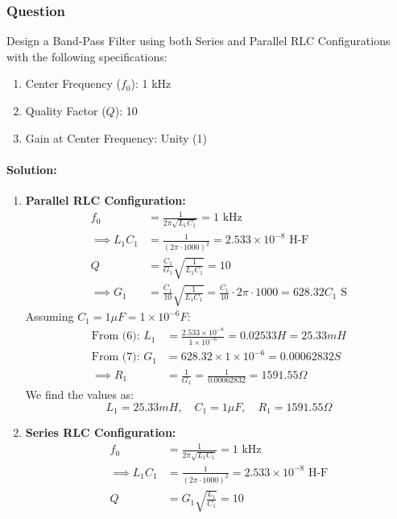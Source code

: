 \subsubsection{Question}
Design a Band-Pass Filter using both Series and Parallel RLC
Configurations with the following specifications:
\begin{enumerate}
  \item Center Frequency (\(f_0\)): 1 kHz
  \item Quality Factor (\(Q\)): 10
  \item Gain at Center Frequency: Unity (1)
\end{enumerate}
\paragraph{Solution:}
\begin{enumerate}
  \item \textbf{Parallel RLC Configuration:}
    \begin{align*}
      f_0 &= \frac{1}{2\pi \sqrt{L_1 C_1}} = 1 \text{ kHz} \\
      \implies L_1 C_1 &= \frac{1}{(2\pi \cdot 1000)^2} = 2.533 \times 10^{-8} \text{ H-F} \tag{6} \\
      Q &= \frac{C_1}{G_1} \sqrt{\frac{1}{L_1 C_1}} = 10 \\
      \implies G_1 &= \frac{C_1}{10} \sqrt{\frac{1}{L_1 C_1}} = \frac{C_1}{10} \cdot 2\pi \cdot 1000 = 628.32 C_1 \text{ S} \tag{7}
    \end{align*}
    Assuming \(C_1 = 1 \mu F = 1 \times 10^{-6} F\):
    \begin{align*}
      \text{From (6): } L_1 &= \frac{2.533 \times 10^{-8}}{1 \times 10^{-6}} = 0.02533 H = 25.33 mH \\
      \text{From (7): } G_1 &= 628.32 \times 1 \times 10^{-6} = 0.00062832 S \\
      \implies R_1 &= \frac{1}{G_1} = \frac{1}{0.00062832} = 1591.55 \Omega
    \end{align*}
    We find the values as:
    \[
      L_1 = 25.33 mH, \quad C_1 = 1 \mu F, \quad R_1 = 1591.55 \Omega
    \]
  \item \textbf{Series RLC Configuration:}
    \begin{align*}
      f_0 &= \frac{1}{2\pi \sqrt{L_1 C_1}} = 1 \text{ kHz} \\
      \implies L_1 C_1 &= \frac{1}{(2\pi \cdot 1000)^2} = 2.533 \times 10^{-8} \text{ H-F} \tag{8} \\
      Q &= G_1 \sqrt{\frac{L_1}{C_1}} = 10 \\

\end{align*}
\end{enumerate}
